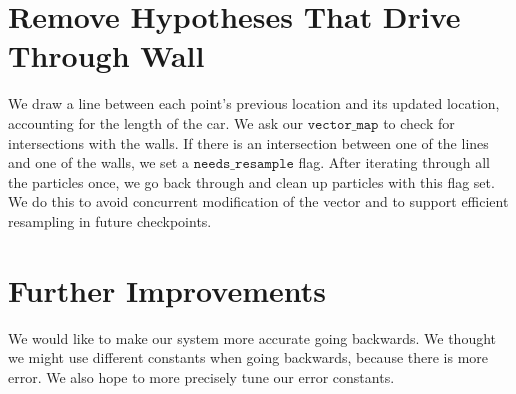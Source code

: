 \section{Remove Hypotheses That Drive Through Wall}
We draw a line between each point's previous location and its updated location, accounting for the length of the car. We ask our $\texttt{vector\_map}$ to check for intersections with the walls. If there is an intersection between one of the lines and one of the walls, we set a $\texttt{needs\_resample}$ flag. After iterating through all the particles once, we go back through and clean up particles with this flag set. We do this to avoid concurrent modification of the vector and to support efficient resampling in future checkpoints.


\section{Further Improvements}
We would like to make our system more accurate going backwards. We thought we might use different constants when going backwards, because there is more error. We also hope to more precisely tune our error constants.


